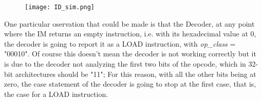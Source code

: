 \begin{figure}[h!]
  \centering
  \texttt{[image: ID\_sim.png]}
\end{figure}

One particular oservation that could be made is that the Decoder, at any point where the IM returns an empty instruction, i.e. with its hexadecimal value at 0, the decoder is going to report it as a LOAD instruction, with \emph{op{\_}class} = "00010". Of course this doesn't mean the decoder is not working correctly but it is due to the decoder not analyzing the first two bits of the opcode, which in 32-bit architectures should be "11"; For this reason, with all the other bits being at zero, the case statement of the decoder is going to stop at the first case, that is, the case for a LOAD instruction.